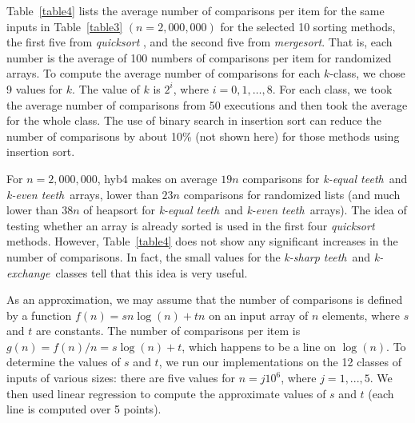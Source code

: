 \documentclass[AMA,STIX1COL]{WileyNJD-v2}
\newcommand{\keq}{\emph{k-equal teeth}}
\newcommand{\kev}{\emph{k-even teeth}}
\newcommand{\ksha}{\emph{k-sharp teeth}}
\newcommand{\kexc}{\emph{k-exchange}}
\newcommand{\qusort}{\emph{quicksort }}
\newcommand{\msortn}{\emph{mergesort}}
\begin{document}
Table~\ref{table4} lists the average number of comparisons per item for the same inputs in Table~\ref{table3} $(n = 2,000,000)$ for the selected 10 sorting methods, the first five from \qusort, and the second five from \msortn. 
That is, each number is the average of 100 numbers of comparisons per item for randomized arrays. 
To compute the average number of comparisons for each $k$-class, we chose 9 values for $k$. 
The value of $k$ is $2^i$, where $i = 0, 1, …, 8$. 
For each class, we took the average number of comparisons from 50 executions and then took the average for the whole class. 
The use of binary search in insertion sort can reduce the number of comparisons by about 10\% (not shown here) for those methods using insertion sort.

For $n = 2,000,000$, hyb4 makes on average $19n$ comparisons for \keq \ and \kev \ arrays, lower than $23n$ comparisons for randomized lists (and much lower than $38n$ of heapsort for \keq\ and \kev\ arrays). 
The idea of testing whether an array is already sorted is used in the first four \qusort methods. 
However, Table~\ref{table4} does not show any significant increases in the number of comparisons. 
In fact, the small values for the \ksha\ and \kexc\ classes tell that this idea is very useful.

As an approximation, we may assume that the number of comparisons is defined by a function $f(n) = sn\log(n) + tn$ on an input array of $n$ elements, where $s$ and $t$ are constants. 
The number of comparisons per item is $g(n) = f(n)/n = s\log(n) + t$, which happens to be a line on $\log(n)$. 
To determine the values of $s$ and $t$, we run our implementations on the 12 classes of inputs of various sizes: there are five values for $n = j10^6$, where $j = 1, ..., 5$. 
We then used linear regression to compute the approximate values of $s$ and $t$ (each line is computed over 5 points).
\end{document}
